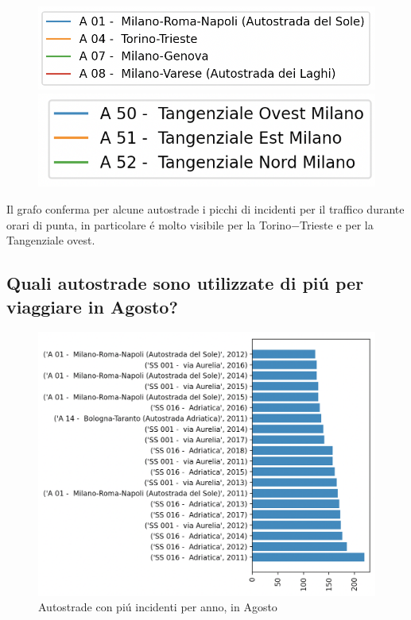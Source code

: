 \documentclass[a4paper]{report}
\begin{document}
\begin{figure}[!ht]
    \includegraphics[width=0.6\linewidth]{../src/incidenti/incidenti_aci/autostrade/legenda_autostrade.png}
    \label{fig:legenda_autostrade}
    \includegraphics[width=0.5\linewidth]{../src/incidenti/incidenti_aci/autostrade/legenda_tangenziali.png}
    \label{fig:legenda_tangenziali}
\end{figure}

Il grafo conferma per alcune autostrade i picchi di incidenti per il traffico durante orari 
di punta, in particolare \'e molto visibile per la Torino$-$Trieste e per la Tangenziale ovest.


\clearpage
\subsection{Quali autostrade sono utilizzate di pi\'u per viaggiare in Agosto?}

\begin{figure}[!ht]
    \includegraphics[width=\linewidth]{../src/incidenti/incidenti_aci/agosto/autostrade_anno_agosto.png}
    \caption{Autostrade con pi\'u incidenti per anno, in Agosto}
    \label{fig:autostrade_anno_agosto}
\end{figure}
\end{document}
